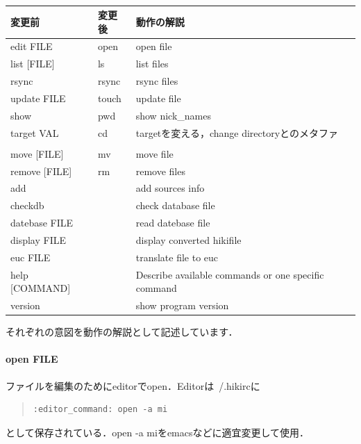 \begin{table}[htbp]\begin{center}
\caption{}
\begin{tabular}{llll}
\hline
変更前  &変更後  &動作の解説  \\ \hline
edit FILE         &open  &open file  \\
list [FILE]       &ls  &list files  \\
rsync             &rsync  &rsync files  \\
update FILE       &touch  &update file  \\
show              &pwd  &show nick\_names  \\
target VAL        &cd  &targetを変える，change directoryとのメタファ  \\
  &  \\
move [FILE]       &mv  &move file  \\
remove [FILE]     &rm  &remove files  \\
add               &  &add sources info  \\
checkdb           &  &check database file  \\
datebase FILE     &  &read datebase file  \\
display FILE      &  &display converted hikifile  \\
euc FILE          &  &translate file to euc  \\
help [COMMAND]    &  &Describe available commands or one specific command  \\
version           &  &show program version  \\
\hline
\end{tabular}
\label{default}
\end{center}\end{table}

それぞれの意図を動作の解説として記述しています．

\paragraph{open FILE}
ファイルを編集のためにeditorでopen．Editorは~/.hikircに
\begin{quote}\begin{verbatim}
:editor_command: open -a mi
\end{verbatim}\end{quote}
として保存されている．open -a miをemacsなどに適宜変更して使用．

